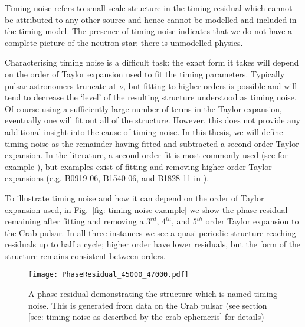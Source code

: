 Timing noise refers to small-scale structure in the timing residual which
cannot be attributed to any other source and hence cannot be modelled and
included in the timing model. The presence of timing noise indicates that we do
not have a complete picture of the neutron star: there is unmodelled physics.

Characterising timing noise is a difficult task: the exact form it takes will
depend on the order of Taylor expansion used to fit the timing parameters.
Typically pulsar astronomers truncate at $\ddot{\nu}$, but fitting to higher
orders is possible and will tend to decrease the `level' of the resulting
structure understood as timing noise. Of course using a sufficiently large
number of terms in the Taylor expansion, eventually one will fit out all of the
structure. However, this does not provide any additional insight into the cause
of timing noise. In this thesis, we will define timing noise as the remainder
having fitted and subtracted a second order Taylor expansion. In the
literature, a second order fit is most commonly used (see for example
\citet{Hobbs2010}), but examples exist of fitting and removing higher order
Taylor expansions (e.g. B0919-06, B1540-06, and B1828-11 in \citet{Lyne2010}).

To illustrate timing noise and how it can depend on the order of Taylor
expansion used, in Fig.~\ref{fig: timing noise example} we show the phase
residual remaining after fitting and removing a $3^{rd}$, $4^{th}$, and
$5^{th}$ order Taylor expansion to the Crab pulsar. In all three instances we
see a quasi-periodic structure reaching residuals up to half a cycle; higher
order have lower residuals, but the form of the structure remains consistent
between orders.  \begin{figure}[htb] \centering
\texttt{[image: PhaseResidual\_45000\_47000.pdf]}
\caption{A phase residual demonstrating the structure which is named timing
noise. This is generated from data on the Crab pulsar (see section \ref{sec:
timing noise as described by the crab ephemeris} for details)} \label{fig:
timing noise example} \end{figure}

